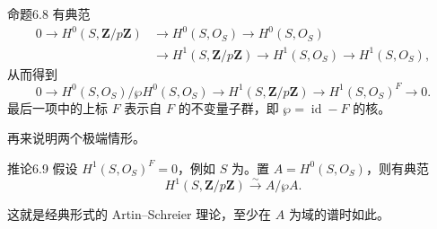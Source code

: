 \begin{SGAresult}{命题}{6.8}
有典范
\[
\begin{aligned}
0\longrightarrow H^0(S,\mathbf Z/p\mathbf Z)&\longrightarrow H^0(S,O_S)
\longrightarrow H^0(S,O_S)\\
&\longrightarrow H^1(S,\mathbf Z/p\mathbf Z)
\longrightarrow H^1(S,O_S)\longrightarrow H^1(S,O_S),
\end{aligned}
\]
从而得到
\[
0\longrightarrow H^0(S,O_S)/\wp H^0(S,O_S)
\longrightarrow H^1(S,\mathbf Z/p\mathbf Z)
\longrightarrow H^1(S,O_S)^F\longrightarrow0.
\]
最后一项中的上标 $F$ 表示自 $F$ 的不变量子群，即 $\wp=\operatorname{id}-F$ 的核。
\end{SGAresult}
再来说明两个极端情形。
\begin{SGAresult}{推论}{6.9}
假设 $H^1(S,O_S)^F=0$，例如 $S$ 为。置 $A=H^0(S,O_S)$，则有典范
\[
H^1(S,\mathbf Z/p\mathbf Z)\xrightarrow{\sim}A/\wp A.
\]
\end{SGAresult}
这就是经典形式的 Artin–Schreier 理论，至少在 $A$ 为域的谱时如此。

